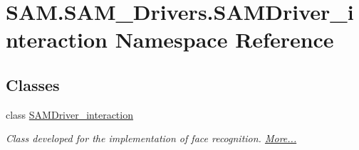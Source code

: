 \hypertarget{namespaceSAM_1_1SAM__Drivers_1_1SAMDriver__interaction}{}\section{S\+A\+M.\+S\+A\+M\+\_\+\+Drivers.\+S\+A\+M\+Driver\+\_\+interaction Namespace Reference}
\label{namespaceSAM_1_1SAM__Drivers_1_1SAMDriver__interaction}
\subsection*{Classes}
\begin{DoxyCompactItemize}
\item 
class \hyperlink{group__icubclient__SAM__Drivers_classSAM_1_1SAM__Drivers_1_1SAMDriver__interaction_1_1SAMDriver__interaction}{S\+A\+M\+Driver\+\_\+interaction}
\begin{DoxyCompactList}\small\item\em Class developed for the implementation of face recognition.  \hyperlink{group__icubclient__SAM__Drivers_classSAM_1_1SAM__Drivers_1_1SAMDriver__interaction_1_1SAMDriver__interaction}{More...}\end{DoxyCompactList}\end{DoxyCompactItemize}
